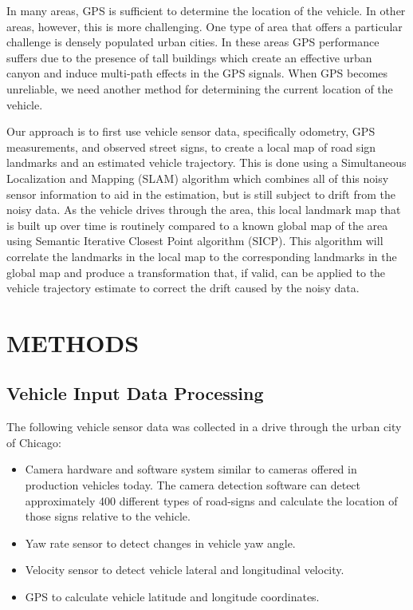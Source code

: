 \documentclass[letterpaper, 10 pt, conference]{ieeeconf}  %
\begin{document}
In many areas, GPS is sufficient to determine the location of the vehicle. In other areas, however, this is more challenging. One type of area that offers a particular challenge is densely populated urban cities. In these areas GPS performance suffers due to the presence of tall buildings which create an effective urban canyon and induce multi-path effects in the GPS signals. When GPS becomes unreliable, we need another method for determining the current location of the vehicle.

Our approach is to first use vehicle sensor data, specifically odometry, GPS measurements, and observed street signs, to create a local map of road sign landmarks and an estimated vehicle trajectory. This is done using a Simultaneous Localization and Mapping (SLAM) algorithm which combines all of this noisy sensor information to aid in the estimation, but is still subject to drift from the noisy data. As the vehicle drives through the area, this local landmark map that is built up over time is routinely compared to a known global map of the area using Semantic Iterative Closest Point algorithm (SICP). This algorithm will correlate the landmarks in the local map to the corresponding landmarks in the global map and produce a transformation that, if valid, can be applied to the vehicle trajectory estimate to correct the drift caused by the noisy data.

\section{METHODS}

\subsection{Vehicle Input Data Processing}

The following vehicle sensor data was collected in a drive through the urban city of Chicago:
\begin{itemize}
\item Camera hardware and software system similar to cameras offered in production vehicles today. The camera detection software can detect approximately 400 different types of road-signs and calculate the location of those signs relative to the vehicle. 
\item Yaw rate sensor to detect changes in vehicle yaw angle.
\item Velocity sensor to detect vehicle lateral and longitudinal velocity.
\item GPS to calculate vehicle latitude and longitude coordinates.
\end{itemize}
\end{document}
